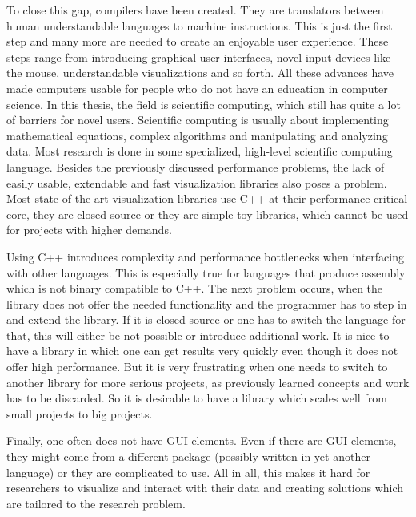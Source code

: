To close this gap, compilers have been created. They are translators between human understandable languages to machine instructions.
This is just the first step and many more are needed to create an enjoyable user experience.
These steps range from introducing graphical user interfaces, novel input devices like the mouse, understandable visualizations and so forth.
All these advances have made computers usable for people who do not have an education in computer science.
In this thesis, the field is scientific computing, which still has quite a lot of barriers for novel users.
Scientific computing is usually about implementing mathematical equations, complex algorithms and manipulating and analyzing data.
Most research is done in some specialized, high-level scientific computing language.
Besides the previously discussed performance problems, the lack of easily usable, extendable and fast visualization libraries also poses a problem.
Most state of the art visualization libraries use C++ at their performance critical core, they are closed source or they are simple toy libraries, which cannot be used for projects with higher demands.

Using C++ introduces complexity and performance bottlenecks when interfacing with other languages. This is especially true for languages that produce assembly which is not binary compatible to C++. 
The next problem occurs, when the library does not offer the needed functionality and the programmer has to step in and extend the library. 
If it is closed source or one has to switch the language for that, this will either be not possible or introduce additional work.
It is nice to have a library in which one can get results very quickly even though it does not offer high performance. 
But it is very frustrating when one needs to switch to another library for more serious projects, as previously learned concepts and work has to be discarded.
So it is desirable to have a library which scales well from small projects to big projects.

Finally, one often does not have GUI elements. 
Even if there are GUI elements, they might come from a different package (possibly written in yet another language) or they are complicated to use.
All in all, this makes it hard for researchers to visualize and interact with their data and creating solutions which are tailored to the research problem.

